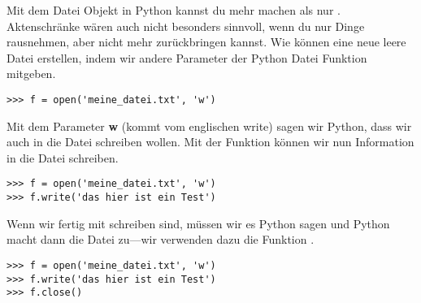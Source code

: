 Mit dem Datei Objekt in Python kannst du mehr machen als nur . Aktenschränke wären auch nicht besonders sinnvoll, wenn du nur Dinge rausnehmen, aber nicht mehr zurückbringen kannst. Wie können eine neue leere Datei erstellen, indem wir andere Parameter der Python Datei Funktion mitgeben.

\begin{Verbatim}[frame=single]
>>> f = open('meine_datei.txt', 'w')
\end{Verbatim}

Mit dem Parameter \textbf{w} (kommt vom englischen write) sagen wir Python, dass wir auch in die Datei schreiben wollen. Mit der Funktion  können wir nun Information in die Datei schreiben.

\begin{Verbatim}[frame=single]
>>> f = open('meine_datei.txt', 'w')
>>> f.write('das hier ist ein Test')
\end{Verbatim}

Wenn wir fertig mit schreiben sind, müssen wir es Python sagen und Python macht dann die Datei zu---wir verwenden dazu die Funktion .

\begin{Verbatim}[frame=single, label= alle Befehle zusammengefasst]
>>> f = open('meine_datei.txt', 'w')
>>> f.write('das hier ist ein Test')
>>> f.close()
\end{Verbatim}

